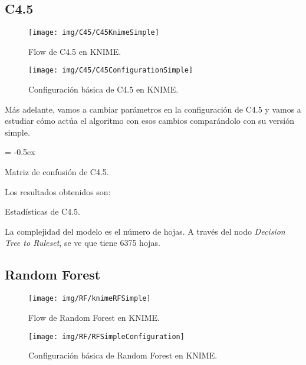 \documentclass[paper=a4, fontsize=12pt]{article} %
\numberwithin{equation}{section} %
\numberwithin{figure}{section} %
\numberwithin{table}{section} %
\begin{document}
	\subsection {C4.5}

	\begin{figure}[H]
	  \centering
	  \texttt{[image: img/C45/C45KnimeSimple]}
	  \caption{Flow de C4.5 en KNIME.}
	  \label{flow_c45s}
	\end{figure}

	\begin{figure}[H]
	  \centering
	  \texttt{[image: img/C45/C45ConfigurationSimple]}
	  \caption{Configuración básica de C4.5 en KNIME.}
	  \label{config_c45s}
	\end{figure}

	Más adelante, vamos a cambiar parámetros en la configuración de C4.5 y vamos a estudiar cómo actúa el algoritmo con esos cambios comparándolo con su versión simple.

	\extrarowheight = -0.5ex %
	\renewcommand{\arraystretch}{1.75} %
	\begin{table}[H]
		\begin{center}
		\end{center}
		\caption {Matriz de confusión de C4.5.}
		\label {mcc45s}
	\end{table}

	Los resultados obtenidos son:
	\begin{table}[H]
		\begin{center}
		\end{center}
		\caption {Estadísticas de C4.5.}
		\label {statisticsC45s}
	\end{table}

	La complejidad del modelo es el número de hojas. A través del nodo \textit{Decision Tree to Ruleset}, se ve que tiene 6375 hojas.

\subsection {Random Forest}

	\begin{figure}[H]
	  \centering
	  \texttt{[image: img/RF/knimeRFSimple]}
	  \caption{Flow de Random Forest en KNIME.}
	  \label{flow_RFs}
	\end{figure}

	\begin{figure}[H]
	  \centering
	  \texttt{[image: img/RF/RFSimpleConfiguration]}
	  \caption{Configuración básica de Random Forest en KNIME.}
	  \label{config_RFs}
	\end{figure}
\end{document}
